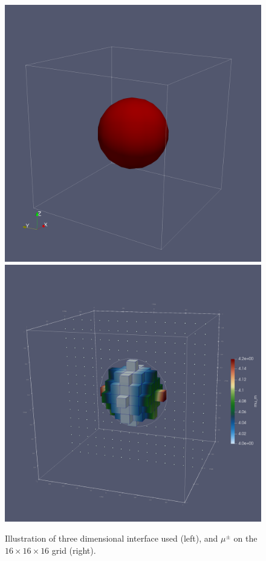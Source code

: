 \documentclass{elsarticle}
\begin{document}
\begin{figure}
	\centering
	\includegraphics[width=0.49\linewidth]{./figures/sphere_shape.png}
	\includegraphics[width=0.49\linewidth]{./figures/sphere_mu_m.png}
	\caption{Illustration of three dimensional interface used (left), and $\mu^\pm$ on the $16\times 16\times 16$ grid (right).}
	\label{fig:sphere}
\end{figure}
\end{document}
